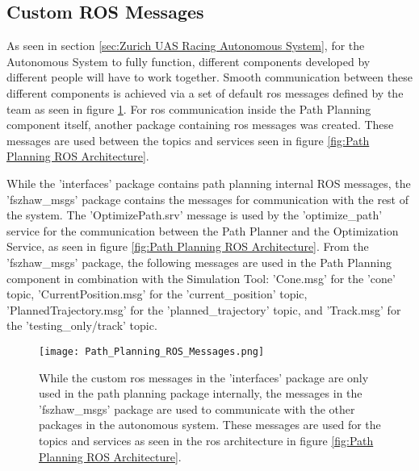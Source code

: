 \subsection{Custom ROS Messages} \label{sec:Custom ROS Messages}
As seen in section \ref{sec:Zurich UAS Racing Autonomous System}, for the Autonomous System to fully function, different components developed by different people will have to work together. Smooth communication between these different components is achieved via a set of default \acrshort{ros} messages defined by the team as seen in figure \ref{fig:Path Planning ROS Messages}. For \acrshort{ros} communication inside the Path Planning component itself, another package containing \acrshort{ros} messages was created. These messages are used between the topics and services seen in figure \ref{fig:Path Planning ROS Architecture}.

While the 'interfaces' package contains path planning internal ROS messages, the 'fszhaw\_msgs' package contains the messages for communication with the rest of the system. The 'OptimizePath.srv' message is used by the 'optimize\_path' service for the communication between the Path Planner and the Optimization Service, as seen in figure \ref{fig:Path Planning ROS Architecture}. From the 'fszhaw\_msgs' package, the following messages are used in the Path Planning component in combination with the Simulation Tool: 'Cone.msg' for the 'cone' topic, 'CurrentPosition.msg' for the 'current\_position' topic, 'PlannedTrajectory.msg' for the 'planned\_trajectory' topic, and 'Track.msg' for the 'testing\_only/track' topic.

\begin{figure}[H]
    \centering
    \texttt{[image: Path\_Planning\_ROS\_Messages.png]}
    \caption{While the custom \acrshort{ros} messages in the 'interfaces' package are only used in the path planning package internally, the messages in the 'fszhaw\_msgs' package are used to communicate with the other packages in the autonomous system. These messages are used for the topics and services as seen in the \acrshort{ros} architecture in figure \ref{fig:Path Planning ROS Architecture}.}
    \label{fig:Path Planning ROS Messages}
\end{figure}

